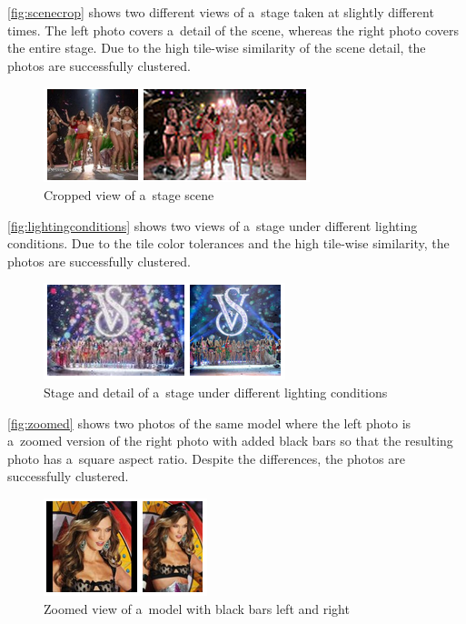 \autoref{fig:scenecrop} shows two different views of a~stage
taken at slightly different times.
The left photo covers a~detail of the scene,
whereas the right photo covers the entire stage.
Due to the high tile-wise similarity of the scene detail,
the photos are successfully clustered.

\begin{figure}[h!]
  \centering
  \includegraphics[width=0.5\linewidth]{./scene.png}
  \caption{Cropped view of a~stage scene}
  \label{fig:scenecrop}
\end{figure}

\autoref{fig:lightingconditions} shows two views of a~stage
under different lighting conditions.
Due to the tile color tolerances and the high tile-wise similarity,
the photos are successfully clustered.

\begin{figure}[h!]
  \centering
  \includegraphics[width=0.5\linewidth]{./viewing_angle.png}
  \caption{Stage and detail of a~stage under different lighting conditions}
  \label{fig:lightingconditions}
\end{figure}

\autoref{fig:zoomed} shows two photos of the same model
where the left photo is a~zoomed version of the right photo 
with added black bars so that the resulting photo
has a~square aspect ratio.
Despite the differences, the photos are successfully clustered.

\begin{figure}[h!]
  \centering
  \includegraphics[width=0.35\linewidth]{./zoom.png}
  \caption{Zoomed view of a~model with black bars left and right}
  \label{fig:zoomed}
\end{figure}

